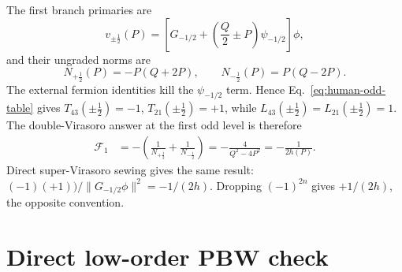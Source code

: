\documentclass[11pt]{article}
\newcommand{\cF}{\mathcal F}
\begin{document}
The first branch primaries are
\begin{equation}
 v_{\pm\frac12}(P)=
 \left[G_{-1/2}+\left(\frac Q2\pm P\right)\psi_{-1/2}\right]\phi,
 \label{eq:first-branch-vectors}
\end{equation}
and their ungraded norms are
\begin{equation}
 N_{+\frac12}(P)=-P(Q+2P),
 \qquad
 N_{-\frac12}(P)=P(Q-2P).
 \label{eq:first-branch-norms}
\end{equation}
The external fermion identities kill the \(\psi_{-1/2}\) term.  Hence
Eq.~\eqref{eq:human-odd-table} gives \(T_{43}(\pm\frac12)=-1\),
\(T_{21}(\pm\frac12)=+1\), while
\(L_{43}(\pm\frac12)=L_{21}(\pm\frac12)=1\).  The double-Virasoro answer at
the first odd level is therefore
\begin{align}
 [z^{1/2}]\cF_1
 &=-\left(\frac1{N_{+\frac12}}+\frac1{N_{-\frac12}}\right)
 =-\frac{4}{Q^2-4P^2}
 =\boxed{-\frac1{2h(P)}}.
 \label{eq:level-half-check}
\end{align}
Direct super-Virasoro sewing gives the same result:
\((-1)(+1))/\lVert G_{-1/2}\phi\rVert^2=-1/(2h)\).
Dropping \((-1)^{2n}\) gives \(+1/(2h)\), the opposite convention.

\section{Direct low-order PBW check}
\end{document}
